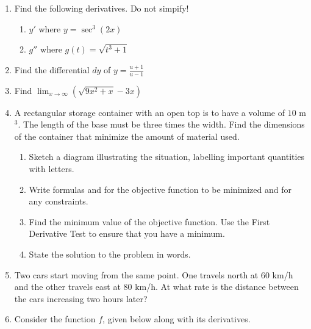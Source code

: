 \documentclass[12pt]{article}
\newcommand{\ds}{\displaystyle}
\begin{document}
\begin{enumerate}
\item Find the following derivatives.  Do not simpify!
  \begin{enumerate}
  \item $\ds y'$
    where 
    $\ds y = \sec^3 (2x)$
\vfill
  \item $\ds g''$
    where 
    $\ds g(t)=\sqrt{t^3+1}$
\vfill
  \end{enumerate}
\newpage
\item Find
  the differential $dy$ of 
  $\ds y=\frac{u+1}{u-1}$
\vfill
\item Find 
  $\ds \lim_{x\to \infty} \left(\sqrt{9x^2+x}-3x\right)$
\vfill
\newpage
\item A rectangular storage container with an open
  top is to have a volume of $10$ m$^3$.  The length of the base must be
  three times
  the width.  Find the dimensions of the container that minimize the
  amount of material used.
  \begin{enumerate}
  \item Sketch a diagram illustrating the situation, labelling important
    quantities with letters.
\vfill
\vfill
  \item Write formulas and for the objective function
    to be minimized and for any constraints.
\vfill
\vfill
  \item Find the minimum value of the objective function.  Use the First
    Derivative Test to ensure that you have a minimum.
\vfill
\vfill
  \item State the solution to the problem in words.
\vfill
  \end{enumerate}
\newpage
\item Two 
  cars start moving from the same point.  One travels 
  north at $60$ km/h
  and the other travels 
  east at $80$ km/h. 
  At what rate is the distance
  between the cars increasing two hours later?
\vfill
\newpage
\item Consider
  the function $f$, given below along with its derivatives.

\end{enumerate}
\end{document}
